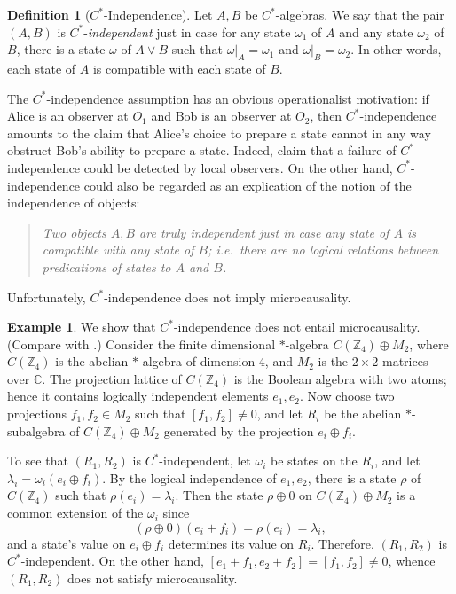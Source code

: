 \documentclass[12pt]{article}
\theoremstyle{definition}
\theoremstyle{definition}
\newtheorem{defn}[thm]{Definition}
\newtheorem{example}[thm]{Example}
\theoremstyle{remark}
\def\7#1{{\mathbb #1}}
\def\om{\omega} \def\Om{\Omega} \def\dd{\partial} \def\D{\Delta}
\begin{document}
\begin{defn}[$C^*$-Independence] Let $A,B$ be $C^*$-algebras.  We say
  that the pair $(A,B)$ is $C^*$-\emph{independent} just in case for
  any state $\om _1$ of $A$ and any state $\om _2$ of $B$, there is a
  state $\om$ of $A\vee B$ such that $\om |_A=\om _1$ and $\om
  |_{B}=\om _2$.  In other words, each state of $A$ is compatible with
  each state of $B$.
\end{defn}

The $C^*$-independence assumption has an obvious operationalist
motivation: if Alice is an observer at $O_1$ and Bob is an observer at
$O_2$, then $C^*$-independence amounts to the claim that Alice's
choice to prepare a state cannot in any way obstruct Bob's ability to
prepare a state.  Indeed, \cite{sumbuc} claim that a failure of
$C^*$-independence could be detected by local observers.  On the other
hand, $C^*$-independence could also be regarded as an explication of
the notion of the independence of objects:
\begin{quote} \textit{Two objects $A,B$ are truly independent just in
    case any state of $A$ is compatible with any state of $B$; i.e.\
    there are no logical relations between predications of states to $A$ and
    $B$.}  \end{quote} 

Unfortunately, $C^*$-independence does not imply microcausality.

\begin{example} We show that $C^*$-independence does not entail
  microcausality.  (Compare with \cite{napi}.) Consider the finite
  dimensional $*$-algebra $C(\7Z _4)\oplus M_2$, where $C(\7Z _4)$ is
  the abelian $*$-algebra of dimension 4, and $M_2$ is the $2\times 2$
  matrices over $\7C$.  The projection lattice of $C(\7Z _4)$ is the
  Boolean algebra with two atoms; hence it contains logically
  independent elements $e_1,e_2$.  Now choose two projections
  $f_1,f_2\in M_2$ such that $[f_1,f_2]\neq 0$, and let $R_i$ be the
  abelian $*$-subalgebra of $C(\7Z _4)\oplus M_2$ generated by the
  projection $e_i\oplus f_i$.

  To see that $(R_1,R_2)$ is $C^*$-independent, let $\om _i$ be states
  on the $R_i$, and let $\lambda _i=\om _i(e_i\oplus f_i)$.  By the
  logical independence of $e_1,e_2$, there is a state $\rho$ of $C(\7Z
  _4)$ such that $\rho (e_i)=\lambda _i$.  Then the state $\rho \oplus
  0$ on $C(\7Z _4)\oplus M_2$ is a common extension of the $\om _i$
  since
$$ (\rho \oplus 0)(e_i+f_i)=\rho (e_i)=\lambda  _i ,$$
and a state's value on $e_i\oplus f_i$ determines its value on $R_i$.
Therefore, $(R_1,R_2)$ is $C^*$-independent.  On the other hand,
$[e_1+f_1,e_2+f_2]=[f_1,f_2]\neq 0$, whence $(R_1,R_2)$ does not
satisfy microcausality.
\end{example}
 
\end{document}

